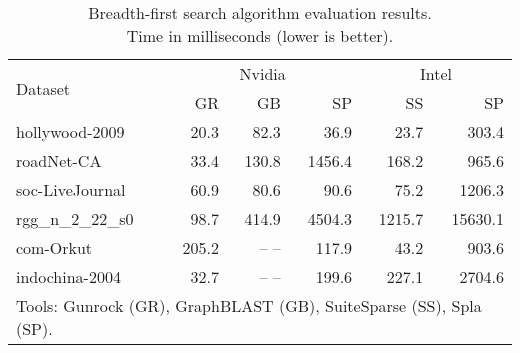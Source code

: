 \begin{table}[h]
\caption{Breadth-first search algorithm evaluation results.\\Time in milliseconds (lower is better).} 
\begin{center}
    \begin{tabular}{|l|r|r|r|r|r|}
    \hline
    \multirow{2}{*}{Dataset} & \multicolumn{3}{c|}{Nvidia} & \multicolumn{2}{c|}{Intel} \\
    \cline{2-6}
    & GR & GB & SP & SS & SP \\
    \hline
    \hline
    \rowcolor{black!10} hollywood-2009    &  20.3 &  82.3 &   36.9 &   23.7 &   303.4 \\
    \rowcolor{black!2 } roadNet-CA        &  33.4 & 130.8 & 1456.4 &  168.2 &   965.6 \\
    \rowcolor{black!10} soc-LiveJournal   &  60.9 &  80.6 &   90.6 &   75.2 &  1206.3 \\
    \rowcolor{black!2 } rgg\_n\_2\_22\_s0 &  98.7 & 414.9 & 4504.3 & 1215.7 & 15630.1 \\
    \rowcolor{black!10} com-Orkut         & 205.2 & -- -- &  117.9 &   43.2 &   903.6 \\
    \rowcolor{black!2 } indochina-2004    &  32.7 & -- -- &  199.6 &  227.1 &  2704.6 \\
    \hline
    \hline
    \multicolumn{6}{l}{Tools: Gunrock (GR), GraphBLAST (GB), SuiteSparse (SS), Spla (SP).} \\
    \end{tabular}
    \label{results:bfs}
\end{center}
\end{table}

